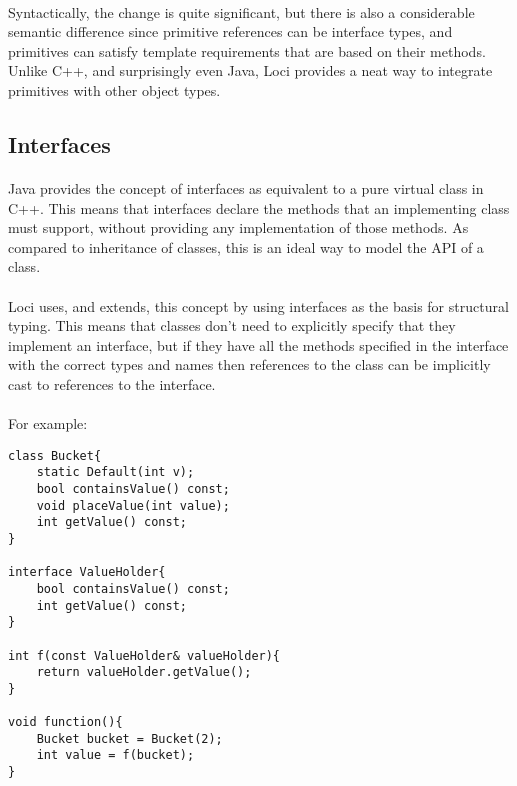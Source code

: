 \documentclass[12pt,twoside,notitlepage]{report}
\begin{document}
\paragraph{}
Syntactically, the change is quite significant, but there is also a considerable semantic difference since primitive references can be interface types, and primitives can satisfy template requirements that are based on their methods. Unlike C++, and surprisingly even Java, Loci provides a neat way to integrate primitives with other object types.

\clearpage

\subsection{Interfaces}

\paragraph{}
Java provides the concept of interfaces as equivalent to a pure virtual class in C++. This means that interfaces declare the methods that an implementing class must support, without providing any implementation of those methods. As compared to inheritance of classes, this is an ideal way to model the API of a class.

\paragraph{}
Loci uses, and extends, this concept by using interfaces as the basis for structural typing. This means that classes don't need to explicitly specify that they implement an interface, but if they have all the methods specified in the interface with the correct types and names then references to the class can be implicitly cast to references to the interface.

\paragraph{}
For example:


\begin{lstlisting}
class Bucket{
	static Default(int v);
	bool containsValue() const;
	void placeValue(int value);
	int getValue() const;
}

interface ValueHolder{
	bool containsValue() const;
	int getValue() const;
}

int f(const ValueHolder& valueHolder){
	return valueHolder.getValue();
}

void function(){
	Bucket bucket = Bucket(2);
	int value = f(bucket);
}
\end{lstlisting}
\end{document}
